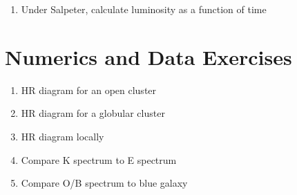 \begin{enumerate}
\item Under Salpeter, calculate luminosity as a function of time
\end{enumerate}

\section{Numerics and Data Exercises}

\begin{enumerate}
\item HR diagram for an open cluster
\item HR diagram for a globular cluster 
\item HR diagram locally
\item Compare K spectrum to E spectrum
\item Compare O/B spectrum to blue galaxy
\end{enumerate}


  
